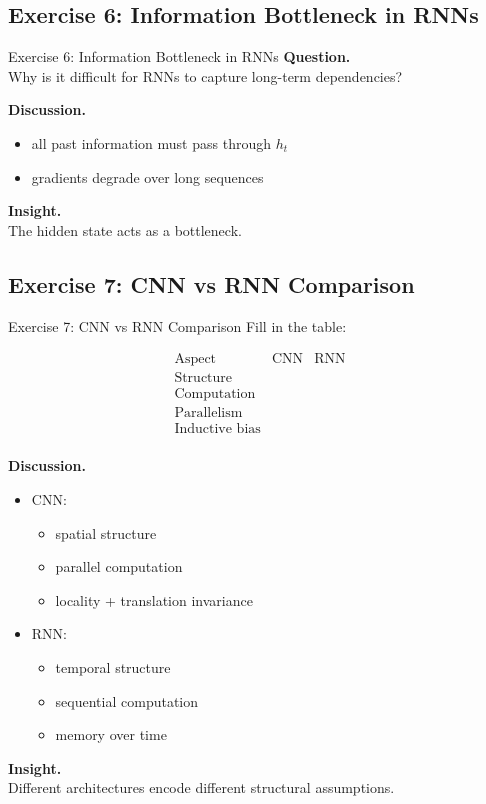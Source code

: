 \documentclass[aspectratio=169,11pt]{beamer}
\begin{document}
\subsection{Exercise 6: Information Bottleneck in RNNs}
\begin{frame}[t,allowframebreaks]{Exercise 6: Information Bottleneck in RNNs}
\small
\textbf{Question.}\\ Why is it difficult for RNNs to capture long-term dependencies?

\textbf{Discussion.}\\ \begin{itemize}
    \item all past information must pass through $h_t$
    \item gradients degrade over long sequences
\end{itemize}

\textbf{Insight.}\\ The hidden state acts as a bottleneck.
\end{frame}

\subsection{Exercise 7: CNN vs RNN Comparison}
\begin{frame}[t,allowframebreaks]{Exercise 7: CNN vs RNN Comparison}
\small
Fill in the table:

\[
\begin{array}{c|c|c}
\text{Aspect} & \text{CNN} & \text{RNN} \\
\hline
\text{Structure} & & \\
\text{Computation} & & \\
\text{Parallelism} & & \\
\text{Inductive bias} & & \\
\end{array}
\]

\textbf{Discussion.}\\ \begin{itemize}
    \item CNN:
    \begin{itemize}
        \item spatial structure
        \item parallel computation
        \item locality + translation invariance
    \end{itemize}

    \item RNN:
    \begin{itemize}
        \item temporal structure
        \item sequential computation
        \item memory over time
    \end{itemize}
\end{itemize}

\textbf{Insight.}\\ Different architectures encode different structural assumptions.
\end{frame}
\end{document}
